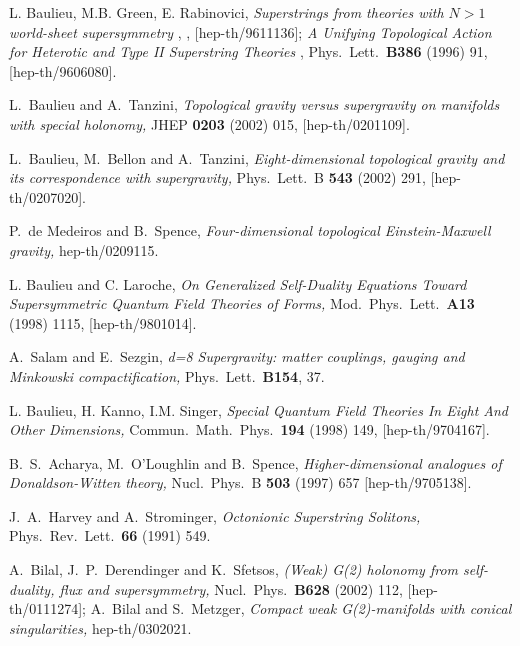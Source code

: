 \documentclass[a4paper,12pt]{article}
\begin{document}
\begin{thebibliography}{15}

L. Baulieu,  M.B. Green, E. Rabinovici,
{ \it Superstrings from theories with $N>1$ world-sheet supersymmetry  },      
,  [hep-th/9611136]; 
{\it  A Unifying Topological Action for Heterotic and Type II Superstring
Theories }, 
Phys.\ Lett.\ {\bf B386} (1996) 91, [hep-th/9606080].

L.~Baulieu and A.~Tanzini,
{\it Topological gravity versus supergravity on manifolds with special holonomy,}
JHEP {\bf 0203} (2002) 015,
[hep-th/0201109].  

L.~Baulieu, M.~Bellon and A.~Tanzini,
{\it Eight-dimensional topological gravity and its correspondence with supergravity,}
Phys.\ Lett.\ B {\bf 543} (2002) 291,
[hep-th/0207020].

P.~de Medeiros and B.~Spence,
{\it Four-dimensional topological Einstein-Maxwell gravity,}
hep-th/0209115.

  L. Baulieu and C. Laroche,
{ \it On Generalized Self-Duality Equations Toward
 Supersymmetric   Quantum Field Theories of Forms,  }      
Mod.\ Phys.\ Lett.\ {\bf  A13} (1998) 1115, [hep-th/9801014].

A.~Salam and E.~Sezgin,
{\it d=8 Supergravity: matter couplings, gauging and Minkowski
compactification,}
Phys.\ Lett.\ {\bf B154}, 37.

L. Baulieu,  H. Kanno, I.M.    Singer,  
{ \it Special Quantum Field Theories In Eight And Other
Dimensions,  }  
Commun.\ Math.\ Phys.\ {\bf  194} (1998) 149, 
[hep-th/9704167].

B.~S.~Acharya, M.~O'Loughlin and B.~Spence,
{\it Higher-dimensional analogues of Donaldson-Witten theory,}
Nucl.\ Phys.\ B {\bf 503} (1997) 657
[hep-th/9705138].

J.~A.~Harvey and A.~Strominger,
{\it Octonionic Superstring Solitons,}
Phys.\ Rev.\ Lett.\ {\bf 66} (1991) 549.

A.~Bilal, J.~P.~Derendinger and K.~Sfetsos,
{\it (Weak) G(2) holonomy from self-duality, flux and supersymmetry,}
Nucl.\ Phys.\  {\bf B628} (2002) 112,
[hep-th/0111274];
A.~Bilal and S.~Metzger,
{\it Compact weak G(2)-manifolds with conical singularities,}
hep-th/0302021.

\end{thebibliography}
\end{document}
